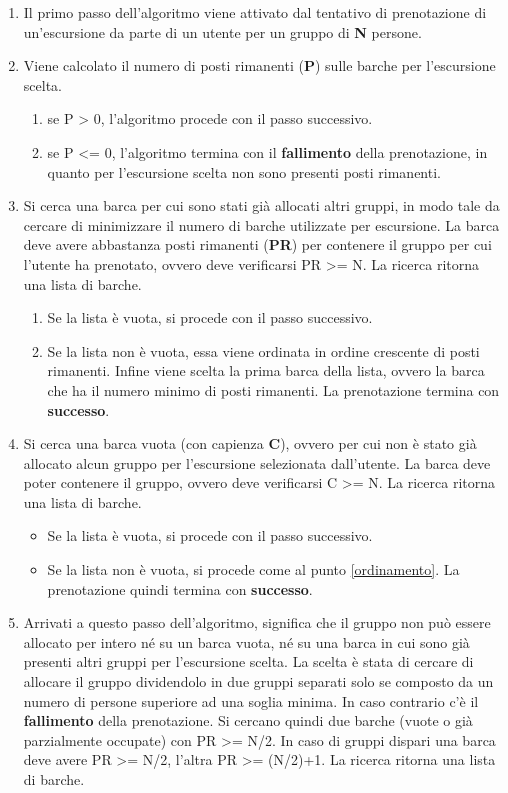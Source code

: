 \begin{enumerate}
    \item Il primo passo dell'algoritmo viene attivato dal tentativo di prenotazione di un'escursione da parte di un utente per un gruppo di \textbf{N} persone.
    \item Viene calcolato il numero di posti rimanenti (\textbf{P}) sulle barche per l'escursione scelta.
    \begin{enumerate}
        \item se P > 0, l'algoritmo procede con il passo successivo.
        \item se P <= 0, l'algoritmo termina con il \textbf{fallimento} della prenotazione, in quanto per l'escursione scelta non sono presenti posti rimanenti. 
    \end{enumerate}
    \item Si cerca una barca per cui sono stati già allocati altri gruppi, in modo tale da cercare di minimizzare il numero di barche utilizzate per escursione. La barca deve avere abbastanza posti rimanenti (\textbf{PR}) per contenere il gruppo per cui l'utente ha prenotato, ovvero deve verificarsi PR >= N. La ricerca ritorna una lista di barche.
    \begin{enumerate}
        \item Se la lista è vuota, si procede con il passo successivo.
        \item \label{ordinamento} Se la lista non è vuota, essa viene ordinata in ordine crescente di posti rimanenti. Infine viene scelta la prima barca della lista, ovvero la barca che ha il numero minimo di posti rimanenti. La prenotazione termina con \textbf{successo}. 
    \end{enumerate}
    \item Si cerca una barca vuota (con capienza \textbf{C}), ovvero per cui non è stato già allocato alcun gruppo per l'escursione selezionata dall'utente. La barca deve poter contenere il gruppo, ovvero deve verificarsi C >= N. La ricerca ritorna una lista di barche. 
    \begin{itemize}
        \item Se la lista è vuota, si procede con il passo successivo.
        \item Se la lista non è vuota, si procede come al punto \ref{ordinamento}. La prenotazione quindi termina con \textbf{successo}.
    \end{itemize}
    \item Arrivati a questo passo dell'algoritmo, significa che il gruppo non può essere allocato per intero né su un barca vuota, né su una barca in cui sono già presenti altri gruppi per l'escursione scelta. La scelta è stata di cercare di allocare il gruppo dividendolo in due gruppi separati solo se composto da un numero di persone superiore ad una soglia minima. In caso contrario c'è il \textbf{fallimento} della prenotazione. Si cercano quindi due barche (vuote o già parzialmente occupate) con PR >= N/2. In caso di gruppi dispari una barca deve avere PR >= N/2, l'altra PR >= (N/2)+1. La ricerca ritorna una lista di barche.

\end{enumerate}
